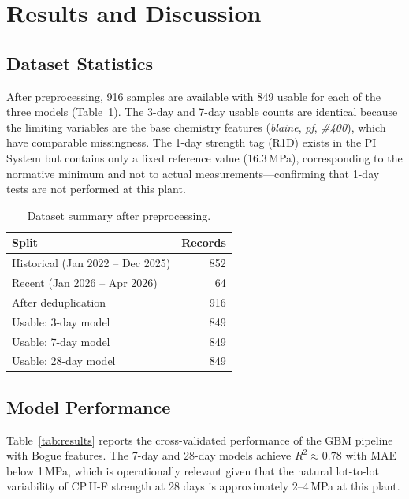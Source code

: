 \documentclass[preprint,12pt]{elsarticle}
\begin{document}
\section{Results and Discussion}
\label{sec:results}

\subsection{Dataset Statistics}

After preprocessing, 916 samples are available with 849 usable for each of the
three models (Table~\ref{tab:dataset}).
The 3-day and 7-day usable counts are identical because the limiting variables
are the base chemistry features (\textit{blaine}, \textit{pf}, \textit{\#400}),
which have comparable missingness.
The 1-day strength tag (R1D) exists in the PI System but contains only a fixed
reference value (16.3\,MPa), corresponding to the normative minimum and not
to actual measurements---confirming that 1-day tests are not performed at this
plant.

\begin{table}[H]
\centering
\caption{Dataset summary after preprocessing.}
\label{tab:dataset}
\begin{tabular}{lr}
\toprule
Split & Records \\
\midrule
Historical (Jan 2022 -- Dec 2025) & 852 \\
Recent (Jan 2026 -- Apr 2026)     &  64 \\
After deduplication               & 916 \\
Usable: 3-day model               & 849 \\
Usable: 7-day model               & 849 \\
Usable: 28-day model              & 849 \\
\bottomrule
\end{tabular}
\end{table}

\subsection{Model Performance}
\label{sec:performance}

Table~\ref{tab:results} reports the cross-validated performance of the GBM
pipeline with Bogue features.
The 7-day and 28-day models achieve $R^2 \approx 0.78$ with MAE below 1\,MPa,
which is operationally relevant given that the natural lot-to-lot variability
of CP\,II-F strength at 28 days is approximately 2--4\,MPa at this plant.
\end{document}
